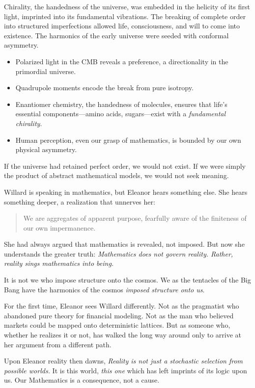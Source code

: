 Chirality, the handedness of the universe, was embedded in the helicity of its first light, imprinted into its fundamental vibrations. The breaking of complete order into structured imperfections allowed life, consciousness, and will to come into existence. The harmonics of the early universe were seeded with conformal asymmetry.

\begin{itemize}
    \item Polarized light in the CMB reveals a preference, a directionality in the primordial universe.
    \item Quadrupole moments encode the break from pure isotropy.
    \item Enantiomer chemistry, the handedness of molecules, ensures that life’s essential components—amino acids, sugars—exist with a \textit{fundamental chirality}.
    \item Human perception, even our grasp of mathematics, is bounded by our own physical asymmetry.
\end{itemize}

If the universe had retained perfect order, we would not exist.  
If we were simply the product of abstract mathematical models, we would not seek meaning.  

\midskip


Willard is speaking in mathematics, but Eleanor hears something else. She hears something deeper, a realization that unnerves her:

\begin{quote}
We are aggregates of apparent purpose,  
fearfully aware of the finiteness of our own impermanence.
\end{quote}

She had always argued that mathematics is revealed, not imposed. But now she understands the greater truth: \textit{Mathematics does not govern reality.  Rather, reality sings mathematics into being.}

It is not we who impose structure onto the cosmos. We as the tentacles of the Big Bang have the harmonics of the cosmos \textit{imposed structure onto us}.

\smallskip

For the first time, Eleanor sees Willard differently.  Not as the pragmatist who abandoned pure theory for financial modeling. Not as the man who believed markets could be mapped onto deterministic lattices. But as someone who, whether he realizes it or not, has walked the long way around only to arrive at her argument from a different path.  

\smallskip

Upon Eleanor reality then dawns, \textit{Reality is not just a stochastic selection from possible worlds.}  
It is this world, \textit{this one} which has left imprints of its logic upon us. Our Mathematics is a consequence, not a cause. 

